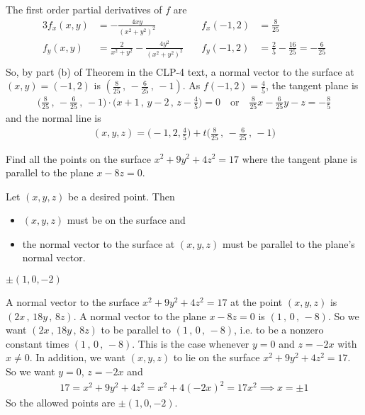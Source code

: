 \begin{solution}
The first order partial derivatives of $f$ are
\begin{alignat*}{3}
f_x(x,y) & = -\frac{4xy}{{(x^2+y^2)}^2}\quad &
      f_x(-1,2) & = \frac{8}{25} \\
f_y(x,y) & = \frac{2}{x^2+y^2}-\frac{4y^2}{{(x^2+y^2)}^2}\quad &
      f_y(-1,2) & = \frac{2}{5}-\frac{16}{25}
                  =-\frac{6}{25} \\
\end{alignat*}
So, by part (b) of Theorem  
in the CLP-4 text, 
a normal vector to the surface at $(x,y)=(-1,2)$ is
$( \frac{8}{25}\,,\,-\frac{6}{25}\,,\,-1)$.
As $f(-1,2)= \frac{4}{5}$, the tangent plane is
\begin{align*}
\Big( \frac{8}{25}\,,\,-\frac{6}{25}\,,\,-1\Big)\cdot
     \Big( x+1\,,\,y-2\,,\,z -\frac{4}{5}\Big)=0\quad \text{or}\quad
\frac{8}{25}x-\frac{6}{25}y-z=-\frac{8}{5} %
\end{align*} 
and the normal line is
\begin{align*}
( x,y,z) = \Big( -1,2,\frac{4}{5}\Big) 
                  +t \Big( \frac{8}{25}\,,\,-\frac{6}{25}\,,\,-1\Big)
\end{align*}
\end{solution}

\begin{question}[M200 2013D] %
Find all the points on the surface $x^2 + 9y^2 + 4z^2 = 17$ 
where the tangent plane is parallel to the plane $x - 8z = 0$.
\end{question}

\begin{hint}
Let $(x,y,z)$ be a desired point. Then  
\begin{itemize}\itemsep1pt \parskip0pt  %
\item 
$(x,y,z)$ must be on the surface and
\item
the normal vector to the surface at $(x,y,z)$ must be parallel to the
plane's normal vector.
\end{itemize}
\end{hint}

\begin{answer}
$\pm(1,0,-2)$
\end{answer}

\begin{solution}
A normal vector to the surface $x^2 + 9y^2 + 4z^2 = 17$
at the point $(x,y,z)$ is $( 2x\,,\, 18y\,,\,8z)$. 
A normal vector to the plane $x - 8z = 0$ is $( 1\,,\,0\,,\,-8)$.
So we want $( 2x\,,\, 18y\,,\,8z)$ to be parallel to
$( 1\,,\,0\,,\,-8)$, i.e. to be a nonzero constant times
$( 1\,,\,0\,,\,-8)$. This is the case whenever $y=0$ and $z=-2x$
with $x\ne 0$. In addition, we want $(x,y,z)$ to lie on the surface
$x^2 + 9y^2 + 4z^2 = 17$. So we want $y=0$, $z=-2x$ and
\begin{align*}
17= x^2 + 9y^2 + 4z^2 =x^2 +4(-2x)^2=17x^2
\implies x=\pm 1
\end{align*} 
So the allowed points are $\pm(1,0,-2)$.
\end{solution}


